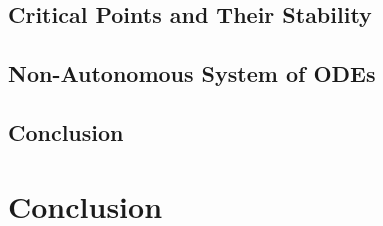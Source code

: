 \documentclass{CPP}
\begin{document}
\section{Critical Points and Their Stability}




% 

\section{Non-Autonomous System of ODEs}



\section{Conclusion}



\chapter{Conclusion}




 
\SuppChap

\newpage
 
%
%



\clearpage


\end{document}
